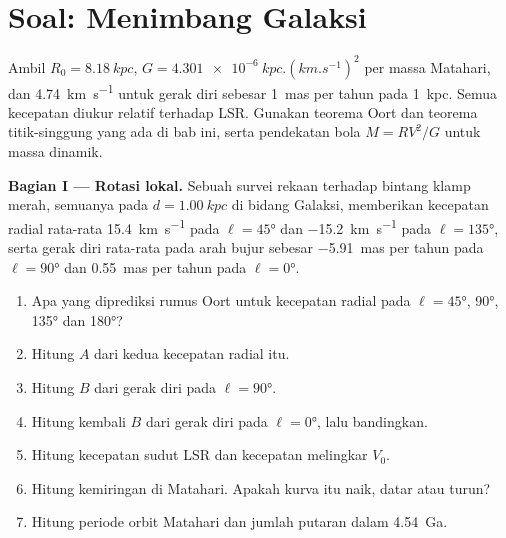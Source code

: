 \section{Soal: Menimbang Galaksi}

\begin{problem}
\label{pb:b3:milky-way-galaxies:1}
Ambil $R_0 = \qty{8.18}{kpc}$, $G = \qty{4.301e-6}{kpc.(km.s^{-1})^2}$ per
massa Matahari, dan \qty{4.74}{km.s^{-1}} untuk gerak diri sebesar
\qty{1}{mas} per tahun pada \qty{1}{kpc}. Semua kecepatan diukur relatif terhadap
LSR. Gunakan teorema Oort dan teorema titik-singgung yang ada di bab ini, serta
pendekatan bola $M = RV^2/G$ untuk massa dinamik.

\medskip\noindent\textbf{Bagian I --- Rotasi lokal.} Sebuah survei rekaan
terhadap bintang klamp merah, semuanya pada $d = \qty{1.00}{kpc}$ di bidang
Galaksi, memberikan kecepatan radial rata-rata \qty{+15.4}{km.s^{-1}} pada
$\ell = \ang{45}$ dan \qty{-15.2}{km.s^{-1}} pada $\ell = \ang{135}$, serta
gerak diri rata-rata pada arah bujur sebesar \qty{-5.91}{mas} per tahun pada
$\ell = \ang{90}$ dan \qty{+0.55}{mas} per tahun pada $\ell = \ang{0}$.
\begin{enumerate}
\item Apa yang diprediksi rumus Oort untuk kecepatan radial pada
  $\ell = \ang{45}$, \ang{90}, \ang{135} dan \ang{180}?
\item Hitung $A$ dari kedua kecepatan radial itu.
\item Hitung $B$ dari gerak diri pada $\ell = \ang{90}$.
\item Hitung kembali $B$ dari gerak diri pada $\ell = \ang{0}$, lalu
  bandingkan.
\item Hitung kecepatan sudut LSR dan kecepatan melingkar
  $V_0$.
\item Hitung kemiringan  di Matahari. Apakah kurva itu naik,
  datar atau turun?
\item Hitung periode orbit Matahari dan jumlah putaran dalam
  \qty{4.54}{Ga}.
\end{enumerate}


\end{problem}

